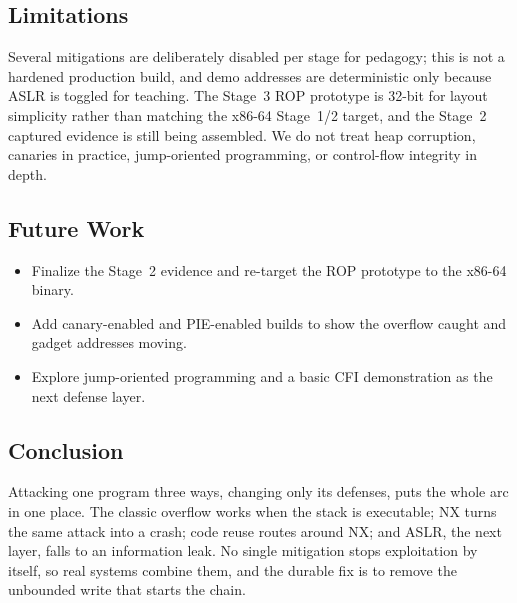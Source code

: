 \documentclass[10pt,twocolumn,letterpaper]{article}
\begin{document}
\subsection{Limitations}
Several mitigations are deliberately disabled per stage for pedagogy; this is not
a hardened production build, and demo addresses are deterministic only because
ASLR is toggled for teaching. The Stage~3 ROP prototype is 32-bit for layout
simplicity rather than matching the x86-64 Stage~1/2 target, and the Stage~2
captured evidence is still being assembled. We do not treat heap corruption,
canaries in practice, jump-oriented programming, or control-flow integrity in
depth.

\subsection{Future Work}
\begin{itemize}
  \item Finalize the Stage~2 evidence and re-target the ROP prototype to the
    x86-64 binary.
  \item Add canary-enabled and PIE-enabled builds to show the overflow caught
    and gadget addresses moving.
  \item Explore jump-oriented programming and a basic CFI demonstration as the
    next defense layer.
\end{itemize}

\subsection{Conclusion}
Attacking one program three ways, changing only its defenses, puts the whole arc
in one place. The classic overflow works when the stack is executable; NX turns
the same attack into a crash; code reuse routes around NX; and ASLR, the next
layer, falls to an information leak. No single mitigation stops exploitation by
itself, so real systems combine them, and the durable fix is to remove the
unbounded write that starts the chain.
\end{document}
